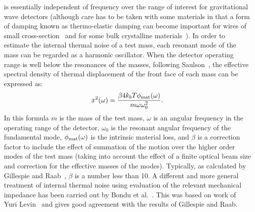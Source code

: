 \documentclass{article}
\begin{document}
is essentially independent of frequency over the range of interest for
gravitational wave detectors (although care has to be taken with some
materials in that a form of damping known as thermo-elastic damping
can become important for wires of small cross-section~\cite{Nowick}
and for some bulk crystalline materials~\cite{Bragthermo}). In order
to estimate the internal thermal noise of a test mass, each resonant
mode of the mass can be regarded as a harmonic oscillator. When the
detector operating range is well below the resonances of the masses,
following Saulson~\cite{Saulson2}, the effective spectral density of
thermal displacement of the front face of each mass can be expressed as:
%
\begin{equation}
  x^{2}(\omega) = \frac{\beta 4 k_{b} T \phi_{\rm mat}(\omega)}{m
  \omega \omega_{0}^{2}}.
  \label{equation:spectraldensity}
\end{equation}
%
In this formula $m$ is the mass of the test mass, $\omega $ is an
angular frequency in the operating range of the detector, $\omega_{0}$
is the resonant angular frequency of the fundamental mode,
$\phi_{\rm mat}(\omega)$ is the intrinsic material loss, and $\beta$
is a correction factor to include the effect of summation of the
motion over the higher order modes of the test mass (taking into
account the effect of a finite optical beam size and correction for
the effective masses of the modes). Typically, as calculated by
Gillespie and Raab~\cite{Gillespie}, $\beta$ is a number less than
10. A different and more general treatment of internal thermal noise
using evaluation of the relevant mechanical impedance has been carried
out by Bondu et al.~\cite{Bondu}. This was based on work of Yuri
Levin~\cite{Levin} and gives good agreement with the results of
Gillespie and Raab.
\end{document}
